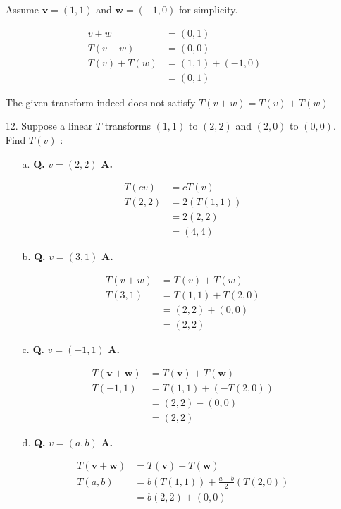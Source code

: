 \documentclass[main.tex]{subfiles}
\begin{document}
\begin{enumerate}
    Assume $\boldsymbol{v}=(1,1)$ and $\boldsymbol{w}=(-1,0)$ for simplicity.

    $$
    \begin{aligned}
    v+w&=(0,1) \\
    T(v+w)&=(0,0)\\
    T(v)+T(w) &=(1,1)+(-1,0) \\
    &=(0,1)
    \end{aligned}
    $$
    
    The given transform indeed does not satisfy $T(v+w)=T(v)+T(w)$
    
    \item [12.] Suppose a linear $T$ transforms $(1,1)$ to $(2,2)$ and $(2,0)$ to $(0,0)$. Find $T(v)$ :
    \begin{enumerate}
        \item [a.] \textbf{Q.} $v=(2,2)$ \textbf{A.}

        $$
        \begin{aligned}
        T(c v) &=c T(v)\\
        T(2,2) &=2(T(1,1)) \\
        &=2(2,2) \\
        &=(4,4)
        \end{aligned}
        $$
        
        \item [b.] \textbf{Q.} $v=(3,1)$ \textbf{A.}

        $$
        \begin{aligned}
        T(v+w)&=T(v)+T(w)\\
        T(3,1) &=T(1,1)+T(2,0) \\
        &=(2,2)+(0,0) \\
        &=(2,2)
        \end{aligned}
        $$
        
        \item [c.] \textbf{Q.} $v=(-1,1)$ \textbf{A.}

        $$
        \begin{aligned}
        T(\boldsymbol{v}+\boldsymbol{w})&=T(\boldsymbol{v})+T(\boldsymbol{w})\\
        T(-1,1) &=T(1,1)+(-T(2,0)) \\
        &=(2,2)-(0,0) \\
        &=(2,2)
        \end{aligned}
        $$
        
        \item [d.] \textbf{Q.} $v=(a, b)$ \textbf{A.}

        $$
        \begin{aligned}
        T(\boldsymbol{v}+\boldsymbol{w})&=T(\boldsymbol{v})+T(\boldsymbol{w})\\
        T(a, b) &=b(T(1,1))+\frac{a-b}{2}(T(2,0)) \\
        &=b(2,2)+(0,0)
        \end{aligned}
        $$
        
    \end{enumerate}
    
\end{enumerate}
\end{document}

